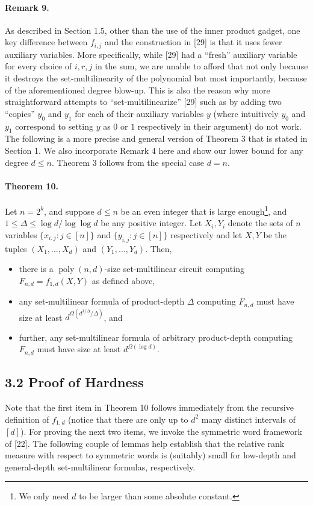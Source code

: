 \paragraph{Remark 9.} As described in Section 1.5, other than the use of the inner product gadget, one key difference between $f_{i,j}$ and the construction in [29] is that it uses fewer auxiliary variables. More specifically, while [29] had a ``fresh'' auxiliary variable for every choice of $i,r,j$ in the sum, we are unable to afford that not only because it destroys the set-multilinearity of the polynomial but most importantly, because of the aforementioned degree blow-up. This is also the reason why more straightforward attempts to ``set-multilinearize'' [29] such as by adding two ``copies'' $y_0$ and $y_1$ for each of their auxiliary variables $y$ (where intuitively $y_0$ and $y_1$ correspond to setting $y$ as $0$ or $1$ respectively in their argument) do not work.
The following is a more precise and general version of Theorem 3 that is stated in Section 1. We also incorporate Remark 4 here and show our lower bound for any degree $d\leq n$. Theorem 3 follows from the special case $d=n$.
\paragraph{Theorem 10.} Let $n=2^k$, and suppose $d\leq n$ be an even integer that is large enough\footnote{We only need $d$ to be larger than some absolute constant.}, and $1\leq\Delta\leq\log d/\log\log d$ be any positive integer. Let $X_i,Y_i$ denote the sets of $n$ variables $\{x_{i,j}:j\in[n]\}$ and $\{y_{i,j}:j\in[n]\}$ respectively and let $X,Y$ be the tuples $(X_1,\ldots,X_d)$ and $(Y_1,\ldots,Y_d)$. Then,
\begin{itemize}
\item there is a $\operatorname{poly}(n,d)$-size set-multilinear circuit computing $F_{n,d}=f_{1,d}(X,Y)$ as defined above,
\item any set-multilinear formula of product-depth $\Delta$ computing $F_{n,d}$ must have size at least $d^{\Omega(d^{1/\Delta}/\Delta)}$, and
\item further, any set-multilinear formula of arbitrary product-depth computing $F_{n,d}$ must have size at least $d^{\Omega(\log d)}$.
\end{itemize}
\subsection*{3.2 Proof of Hardness}
Note that the first item in Theorem 10 follows immediately from the recursive definition of $f_{1,d}$ (notice that there are only up to $d^2$ many distinct intervals of $[d]$). For proving the next two items, we invoke the symmetric word framework of [22]. The following couple of lemmas help establish that the relative rank measure with respect to symmetric words is (suitably) small for low-depth and general-depth set-multilinear formulas, respectively.
